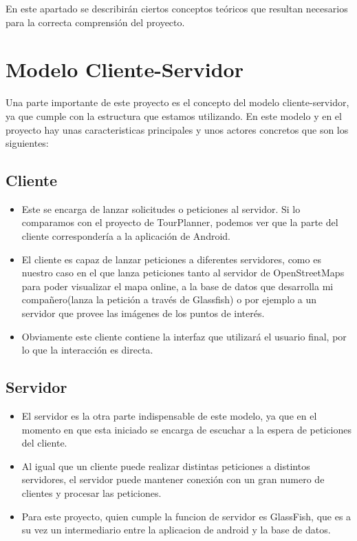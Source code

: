 
En este apartado se describirán ciertos conceptos teóricos que resultan necesarios para la correcta comprensión del proyecto.

\section{Modelo Cliente-Servidor}

Una parte importante de este proyecto es el concepto del modelo cliente-servidor, ya que cumple con la estructura que estamos utilizando. En este modelo y en el proyecto hay unas caracteristicas principales y unos actores concretos que son los siguientes:

\subsection{Cliente}
\begin{itemize}
\item Este se encarga de lanzar solicitudes o peticiones al servidor. Si lo comparamos con el proyecto de TourPlanner, podemos ver que la parte del cliente correspondería a la aplicación de Android.

\item El cliente es capaz de lanzar peticiones a diferentes servidores, como es nuestro caso en el que lanza peticiones tanto al servidor de OpenStreetMaps para poder visualizar el mapa online, a la base de datos que desarrolla mi compañero(lanza la petición a través de Glassfish) o por ejemplo a un servidor que provee las imágenes de los puntos de interés.

\item Obviamente este cliente contiene la interfaz que utilizará el usuario final, por lo que la interacción es directa.
\end{itemize}

\subsection{Servidor}
\begin{itemize}
\item El servidor es la otra parte indispensable de este modelo, ya que en el momento en que esta iniciado se encarga de escuchar a la espera de peticiones del cliente.

\item Al igual que un cliente puede realizar distintas peticiones a distintos servidores, el servidor puede mantener conexión con un gran numero de clientes y procesar las peticiones. 

\item Para este proyecto, quien cumple la funcion de servidor es GlassFish, que es a su vez un intermediario entre la aplicacion de android y la base de datos.
\end{itemize}

